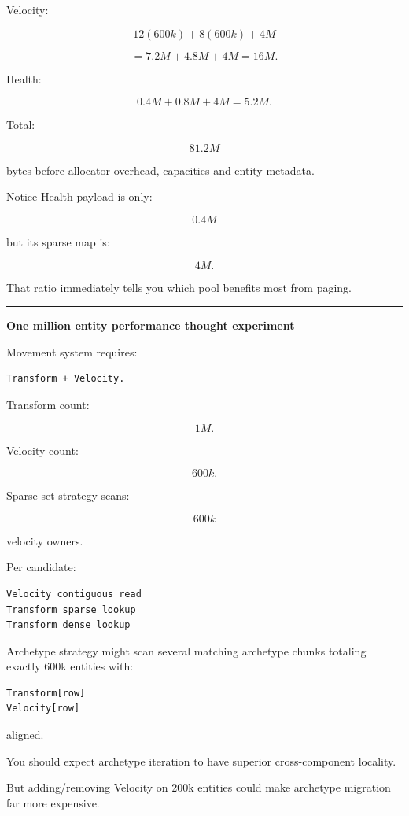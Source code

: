 Velocity:

\[
12(600k)+8(600k)+4M
\]

\[
=7.2M+4.8M+4M
=
16M.
\]

Health:

\[
0.4M+0.8M+4M
=
5.2M.
\]

Total:

\[
81.2M
\]

bytes before allocator overhead, capacities and entity metadata.

Notice Health payload is only:

\[
0.4M
\]

but its sparse map is:

\[
4M.
\]

That ratio immediately tells you which pool benefits most from paging.

\begin{center}\rule{0.5\linewidth}{0.5pt}\end{center}

\textbf{One million entity performance thought experiment}

Movement system requires:

\begin{verbatim}
Transform + Velocity.
\end{verbatim}

Transform count:

\[
1M.
\]

Velocity count:

\[
600k.
\]

Sparse-set strategy scans:

\[
600k
\]

velocity owners.

Per candidate:

\begin{verbatim}
Velocity contiguous read
Transform sparse lookup
Transform dense lookup
\end{verbatim}

Archetype strategy might scan several matching archetype chunks totaling exactly 600k entities with:

\begin{verbatim}
Transform[row]
Velocity[row]
\end{verbatim}

aligned.

You should expect archetype iteration to have superior cross-component locality.

But adding/removing Velocity on 200k entities could make archetype migration far more expensive.

